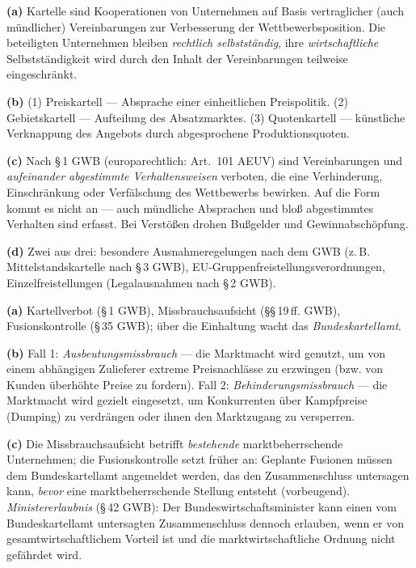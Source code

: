 \documentclass[11pt, a4paper]{article}
\begin{document}
\begin{loesung}[title={Lösung Aufgabe~2 --- Kartellverbot und Kartellarten}]
\textbf{(a)} Kartelle sind Kooperationen von Unternehmen auf Basis vertraglicher
(auch mündlicher) Vereinbarungen zur Verbesserung der Wettbewerbsposition. Die
beteiligten Unternehmen bleiben \emph{rechtlich selbstständig}, ihre
\emph{wirtschaftliche} Selbstständigkeit wird durch den Inhalt der Vereinbarungen
teilweise eingeschränkt.

\textbf{(b)} (1) Preiskartell --- Absprache einer einheitlichen Preispolitik.
(2) Gebietskartell --- Aufteilung des Absatzmarktes. (3) Quotenkartell --- künstliche
Verknappung des Angebots durch abgesprochene Produktionsquoten.

\textbf{(c)} Nach \S\,1 GWB (europarechtlich: Art.~101 AEUV) sind Vereinbarungen und
\emph{aufeinander abgestimmte Verhaltensweisen} verboten, die eine Verhinderung,
Einschränkung oder Verfälschung des Wettbewerbs bewirken. Auf die Form kommt es nicht an
--- auch mündliche Absprachen und bloß abgestimmtes Verhalten sind erfasst. Bei Verstößen
drohen Bußgelder und Gewinnabschöpfung.

\textbf{(d)} Zwei aus drei: besondere Ausnahmeregelungen nach dem GWB (z.\,B.
Mittelstandskartelle nach \S\,3 GWB), EU-Gruppenfreistellungsverordnungen,
Einzelfreistellungen (Legalausnahmen nach \S\,2 GWB).
\end{loesung}

\begin{loesung}[title={Lösung Aufgabe~3 --- Missbrauchsaufsicht und Fusionskontrolle}]
\textbf{(a)} Kartellverbot (\S\,1 GWB), Missbrauchsaufsicht (\S\S\,19\,ff. GWB),
Fusionskontrolle (\S\,35 GWB); über die Einhaltung wacht das \emph{Bundeskartellamt}.

\textbf{(b)} Fall 1: \emph{Ausbeutungsmissbrauch} --- die Marktmacht wird genutzt, um von
einem abhängigen Zulieferer extreme Preisnachlässe zu erzwingen (bzw. von Kunden
überhöhte Preise zu fordern). Fall 2: \emph{Behinderungsmissbrauch} --- die Marktmacht
wird gezielt eingesetzt, um Konkurrenten über Kampfpreise (Dumping) zu verdrängen oder
ihnen den Marktzugang zu versperren.

\textbf{(c)} Die Missbrauchsaufsicht betrifft \emph{bestehende} marktbeherrschende
Unternehmen; die Fusionskontrolle setzt früher an: Geplante Fusionen müssen dem
Bundeskartellamt angemeldet werden, das den Zusammenschluss untersagen kann, \emph{bevor}
eine marktbeherrschende Stellung entsteht (vorbeugend). \emph{Ministererlaubnis}
(\S\,42 GWB): Der Bundeswirtschaftsminister kann einen vom Bundeskartellamt untersagten
Zusammenschluss dennoch erlauben, wenn er von gesamtwirtschaftlichem Vorteil ist und die
marktwirtschaftliche Ordnung nicht gefährdet wird.
\end{loesung}
\end{document}
